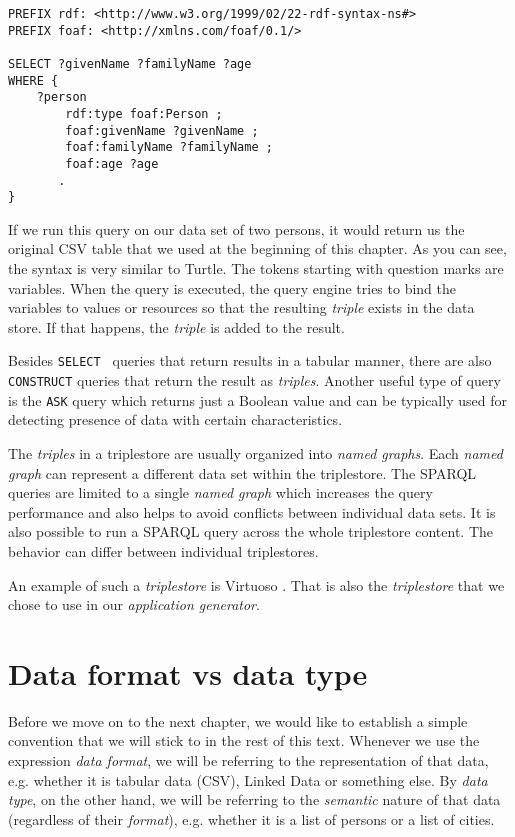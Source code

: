 \begin{verbatim}
PREFIX rdf: <http://www.w3.org/1999/02/22-rdf-syntax-ns#>
PREFIX foaf: <http://xmlns.com/foaf/0.1/>

SELECT ?givenName ?familyName ?age
WHERE {
    ?person
        rdf:type foaf:Person ; 
        foaf:givenName ?givenName ;
        foaf:familyName ?familyName ;
        foaf:age ?age
       . 
}
\end{verbatim}

If we run this query on our data set of two persons, it would return us the original CSV table that we used at the beginning of this chapter. As you can see, the syntax is very similar to Turtle. The tokens starting with question marks are variables. When the query is executed, the query engine tries to bind the variables to values or resources so that the resulting \emph{triple} exists in the data store. If that happens, the \emph{triple} is added to the result.

Besides \texttt{SELECT } queries that return results in a tabular manner, there are also \texttt{CONSTRUCT} queries that return the result as \emph{triples}. Another useful type of query is the \texttt{ASK} query which returns just a Boolean value and can be typically used for detecting presence of data with certain characteristics.

The \emph{triples} in a triplestore are usually organized into \emph{named graphs}. Each \emph{named graph} can represent a different data set within the triplestore. The SPARQL queries are limited to a single \emph{named graph} which increases the query performance and also helps to avoid conflicts between individual data sets. It is also possible to run a SPARQL query across the whole triplestore content. The behavior can differ between individual triplestores.

An example of such a \emph{triplestore} is Virtuoso \cite{virtuoso}. That is also the \emph{triplestore} that we chose to use in our \emph{application generator}.

\section{Data format vs data type}

Before we move on to the next chapter, we would like to establish a simple convention that we will stick to in the rest of this text. Whenever we use the expression \emph{data format}, we will be referring to the representation of that data, e.g. whether it is tabular data (CSV), Linked Data or something else. By \emph{data type}, on the other hand, we will be referring to the \emph{semantic} nature of that data (regardless of their \emph{format}), e.g. whether it is a list of persons or a list of cities.